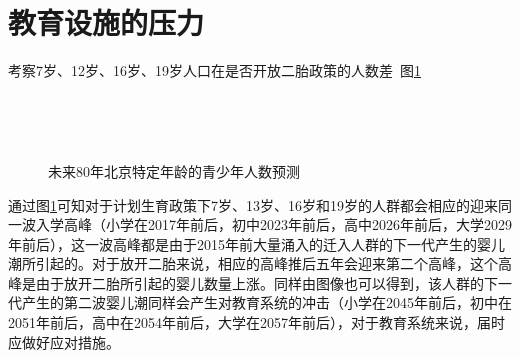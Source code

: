 \documentclass[a4paper]{article}
\begin{document}
\section{教育设施的压力}
考察7岁、12岁、16岁、19岁人口在是否开放二胎政策的人数差\ 图\ref{future_edu}
	\begin{figure}
		\centering
		\\
		\caption{未来80年北京特定年龄的青少年人数预测}
		 \\
		\label{future_edu}
	\end{figure}
通过图\ref{future_edu}可知对于计划生育政策下7岁、13岁、16岁和19岁的人群都会相应的迎来同一波入学高峰（小学在2017年前后，初中2023年前后，高中2026年前后，大学2029年前后），这一波高峰都是由于2015年前大量涌入的迁入人群的下一代产生的婴儿潮所引起的。对于放开二胎来说，相应的高峰推后五年会迎来第二个高峰，这个高峰是由于放开二胎所引起的婴儿数量上涨。同样由图像也可以得到，该人群的下一代产生的第二波婴儿潮同样会产生对教育系统的冲击（小学在2045年前后，初中在2051年前后，高中在2054年前后，大学在2057年前后），对于教育系统来说，届时应做好应对措施。
\end{document}
